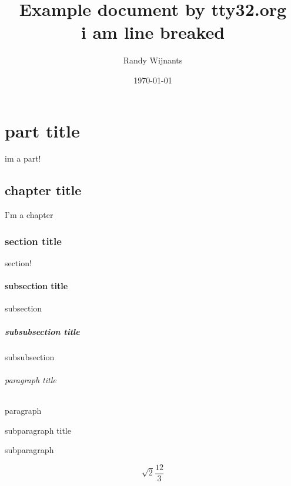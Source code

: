 \documentclass[11pt,a4paper]{report}
\begin{document}

	\newcommand{\tty}{tty32.org}

	\title{Example document by \tty \\
			i am line breaked}
	\author{Randy Wijnants}
	\date{\today} %
	\maketitle

	\tableofcontents
	\listoffigures 
	\listoftables 
	\lstlistoflistings

%
%

	\part {part title}
	im a part!

	\chapter{chapter title}
	I'm a chapter

	\section{section title}
	section!

	\subsection{subsection title}
	subsection

	\subsubsection{subsubsection title}
	subsubsection

	\paragraph{paragraph title}
	paragraph

	\subparagraph{subparagraph title}
	subparagraph

		\begin{equation} \label{eq:solved}
		\sqrt{2}{\frac{12}{3}}
		\end{equation}
\end{document}
